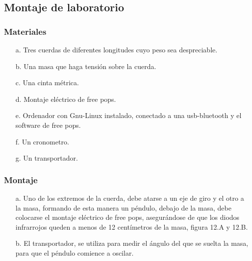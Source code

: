 \documentclass[12pt]{article}
\begin{document}
\begin{multicols}{2}
\subsection{Montaje de laboratorio}
\subsubsection{Materiales}
\begin{enumerate}
\item[a. ] Tres cuerdas de diferentes longitudes cuyo peso sea despreciable.
\item[b. ] Una masa que haga tensión sobre la cuerda.
\item[c. ] Una cinta métrica.
\item[d. ] Montaje eléctrico de free pops.
\item[e. ] Ordenador con Gnu-Linux instalado, conectado a una usb-bluetooth y el software de free pops.
\item[f. ] Un cronometro. 
\item[g. ] Un transportador. 
\end{enumerate}

\subsubsection{Montaje}

\begin{enumerate}
\item[a. ] Uno de los extremos de la cuerda, debe atarse a un eje de giro y el otro a la masa, formando de esta manera un péndulo,  debajo de la masa, debe colocarse el montaje eléctrico de free pops, asegurándose de que los diodos infrarrojos queden a menos de 12  centímetros  de la masa, figura 12.A y 12.B.
\item[b. ] El transportador, se  utiliza para medir el ángulo del que se suelta la masa, para que el péndulo comience a oscilar.
\end{enumerate}


\end{multicols}
\end{document}
